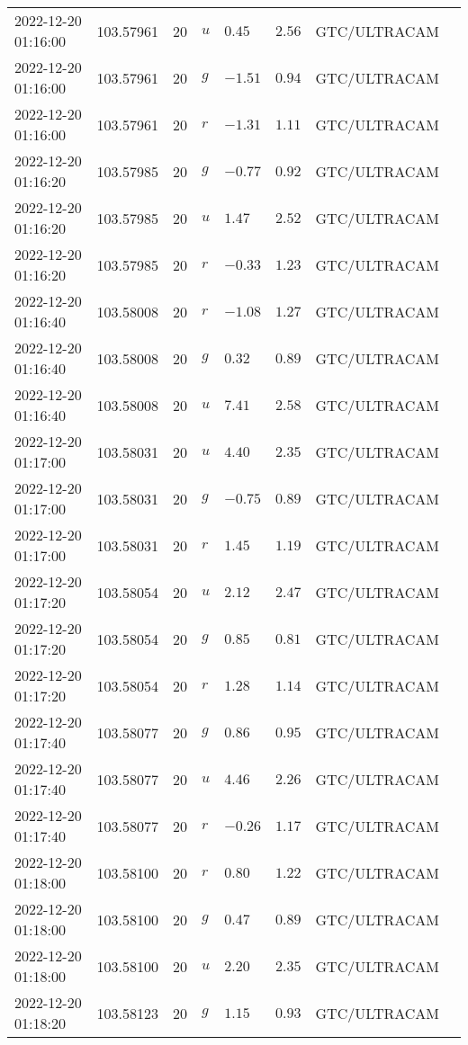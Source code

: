 \documentclass{nature_plusfigure}
\begin{document}
\begin{supplement}
\begin{center}
\begin{longtable}{llllllll}
2022-12-20 01:16:00 & 103.57961 & 20 & $u$ & $0.45$ & $2.56$ & GTC/ULTRACAM &  \\ 
2022-12-20 01:16:00 & 103.57961 & 20 & $g$ & $-1.51$ & $0.94$ & GTC/ULTRACAM &  \\ 
2022-12-20 01:16:00 & 103.57961 & 20 & $r$ & $-1.31$ & $1.11$ & GTC/ULTRACAM &  \\ 
2022-12-20 01:16:20 & 103.57985 & 20 & $g$ & $-0.77$ & $0.92$ & GTC/ULTRACAM &  \\ 
2022-12-20 01:16:20 & 103.57985 & 20 & $u$ & $1.47$ & $2.52$ & GTC/ULTRACAM &  \\ 
2022-12-20 01:16:20 & 103.57985 & 20 & $r$ & $-0.33$ & $1.23$ & GTC/ULTRACAM &  \\ 
2022-12-20 01:16:40 & 103.58008 & 20 & $r$ & $-1.08$ & $1.27$ & GTC/ULTRACAM &  \\ 
2022-12-20 01:16:40 & 103.58008 & 20 & $g$ & $0.32$ & $0.89$ & GTC/ULTRACAM &  \\ 
2022-12-20 01:16:40 & 103.58008 & 20 & $u$ & $7.41$ & $2.58$ & GTC/ULTRACAM &  \\ 
2022-12-20 01:17:00 & 103.58031 & 20 & $u$ & $4.40$ & $2.35$ & GTC/ULTRACAM &  \\ 
2022-12-20 01:17:00 & 103.58031 & 20 & $g$ & $-0.75$ & $0.89$ & GTC/ULTRACAM &  \\ 
2022-12-20 01:17:00 & 103.58031 & 20 & $r$ & $1.45$ & $1.19$ & GTC/ULTRACAM &  \\ 
2022-12-20 01:17:20 & 103.58054 & 20 & $u$ & $2.12$ & $2.47$ & GTC/ULTRACAM &  \\ 
2022-12-20 01:17:20 & 103.58054 & 20 & $g$ & $0.85$ & $0.81$ & GTC/ULTRACAM &  \\ 
2022-12-20 01:17:20 & 103.58054 & 20 & $r$ & $1.28$ & $1.14$ & GTC/ULTRACAM &  \\ 
2022-12-20 01:17:40 & 103.58077 & 20 & $g$ & $0.86$ & $0.95$ & GTC/ULTRACAM &  \\ 
2022-12-20 01:17:40 & 103.58077 & 20 & $u$ & $4.46$ & $2.26$ & GTC/ULTRACAM &  \\ 
2022-12-20 01:17:40 & 103.58077 & 20 & $r$ & $-0.26$ & $1.17$ & GTC/ULTRACAM &  \\ 
2022-12-20 01:18:00 & 103.58100 & 20 & $r$ & $0.80$ & $1.22$ & GTC/ULTRACAM &  \\ 
2022-12-20 01:18:00 & 103.58100 & 20 & $g$ & $0.47$ & $0.89$ & GTC/ULTRACAM &  \\ 
2022-12-20 01:18:00 & 103.58100 & 20 & $u$ & $2.20$ & $2.35$ & GTC/ULTRACAM &  \\ 
2022-12-20 01:18:20 & 103.58123 & 20 & $g$ & $1.15$ & $0.93$ & GTC/ULTRACAM &  \\ 

\end{longtable}
\end{center}
\end{supplement}
\end{document}
